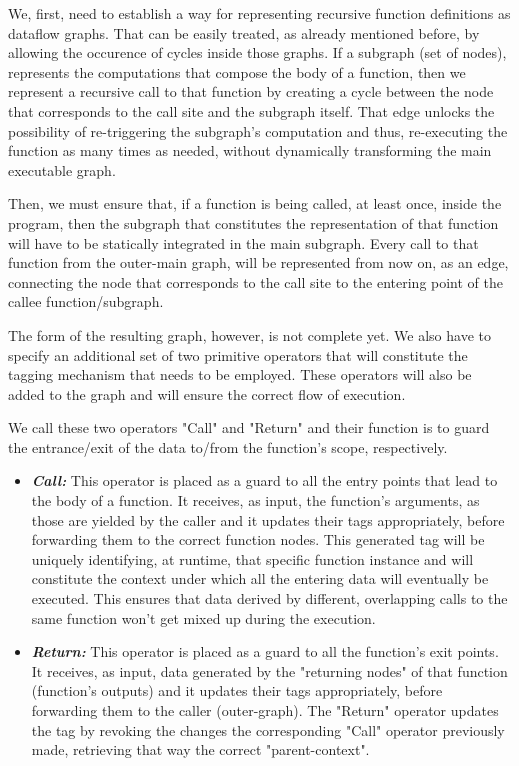 \documentclass[ack,preface]{dithesis}
\begin{document}
We, first, need to establish a way for representing recursive function definitions as dataflow graphs.  That can be easily treated, as already mentioned before, by allowing the occurence of cycles inside those graphs. If a subgraph (set of nodes), represents the computations that compose the body of a function, then we represent a recursive call to that function by creating a cycle between the node that corresponds to the call site and the subgraph itself. That edge unlocks the possibility of  re-triggering the subgraph's computation and thus, re-executing the function as many times as needed, without dynamically transforming the main executable graph.

Then, we must ensure that, if a function is being called, at least once, inside the program, then the subgraph that constitutes the representation of that function will have to be statically integrated in the main subgraph. Every call to that function from the outer-main graph, will be represented from now on, as an edge, connecting the node that corresponds to the call site to the entering point of the callee function/subgraph.

The form of the resulting graph, however, is not complete yet. We also have to specify an additional set of two primitive operators that will constitute the tagging mechanism that needs to be employed. These operators will also be added to the graph and will ensure the correct flow of execution.

We call these two operators "Call" and "Return" and their function is to guard the entrance/exit of the data to/from the function's scope, respectively.

    \begin{itemize}

    \item \textit{\textbf{Call:}} This operator is placed as a guard to all the entry points that lead to the body of a function. It receives, as input, the function's arguments, as those are yielded by the caller and it updates their tags appropriately, before forwarding them to the correct function nodes. This generated tag will be uniquely identifying, at runtime, that specific function instance and will constitute the context under which all the entering data will eventually be executed. This ensures that data derived by different, overlapping calls to the same function won't get mixed up during the execution.

    \item \textit{\textbf{Return:}} This operator is placed as a guard to all the function's exit points. It receives, as input, data generated by the "returning nodes" of that function (function's outputs) and it updates their tags appropriately, before forwarding them to the caller (outer-graph).  The "Return" operator updates the tag by revoking the changes the corresponding "Call" operator previously made, retrieving that way the correct "parent-context".

    \end{itemize}
\end{document}
